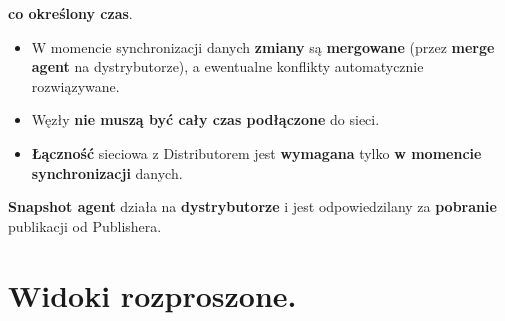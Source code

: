 \documentclass[a4paper]{article}
\begin{document}
\begin{itemize}[noitemsep]
        \textbf{co określony czas}.
        \begin{itemize}[noitemsep]
            \item W momencie synchronizacji danych \textbf{zmiany} są \textbf{mergowane} (przez \textbf{merge agent} na
            dystrybutorze), a ewentualne konflikty automatycznie rozwiązywane.
            \item Węzły \textbf{nie muszą być cały czas podłączone} do sieci.
            \item \textbf{Łączność} sieciowa z Distributorem jest \textbf{wymagana} tylko \textbf{w momencie
            synchronizacji} danych.
        \end{itemize}
    \end{itemize}
    \textbf{Snapshot agent} działa na \textbf{dystrybutorze} i jest odpowiedzilany za \textbf{pobranie} publikacji od
    Publishera.


    \section{Widoki rozproszone.}
\end{document}
